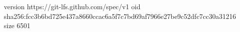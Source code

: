 version https://git-lfs.github.com/spec/v1
oid sha256:fcc3b6bd725e437a8660ccac6a5f7c7bd69af7966e27be9c52dfc7cc30a31216
size 6501
